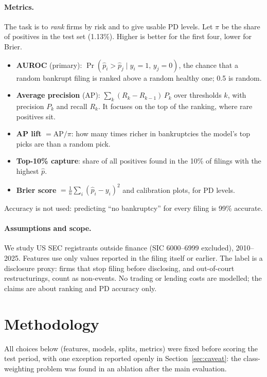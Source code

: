 \paragraph{Metrics.} The task is to \emph{rank} firms by risk and to give usable PD levels. Let $\pi$ be
the share of positives in the test set (1.13\%). Higher is better for the first four, lower for Brier.
\begin{itemize}
  \item \textbf{AUROC} (primary): $\Pr(\hat p_i > \hat p_j \mid y_i=1,\, y_j=0)$, the chance that a random
        bankrupt filing is ranked above a random healthy one; 0.5 is random.
  \item \textbf{Average precision} (AP): $\sum_k (R_k - R_{k-1})\, P_k$ over thresholds $k$, with
        precision $P_k$ and recall $R_k$. It focuses on the top of the ranking, where rare positives sit.
  \item \textbf{AP lift} $=\mathrm{AP}/\pi$: how many times richer in bankruptcies the model's top picks are than a random pick.
  \item \textbf{Top-10\% capture}: share of all positives found in the 10\% of filings with the highest $\hat p$.
  \item \textbf{Brier score} $=\frac{1}{n}\sum_i (\hat p_i - y_i)^2$ and calibration plots, for PD levels.
\end{itemize}
Accuracy is not used: predicting ``no bankruptcy'' for every filing is 99\% accurate.

\paragraph{Assumptions and scope.} We study US SEC registrants outside finance (SIC 6000--6999 excluded),
2010--2025. Features use only values reported in the filing itself or earlier. The label is a disclosure
proxy: firms that stop filing before disclosing, and out-of-court restructurings, count as non-events.
No trading or lending costs are modelled; the claims are about ranking and PD accuracy only.

\section{Methodology}
\label{sec:methodology}

All choices below (features, models, splits, metrics) were fixed before scoring the test period, with one
exception reported openly in Section~\ref{sec:caveat}: the class-weighting problem was found in an
ablation after the main evaluation.

